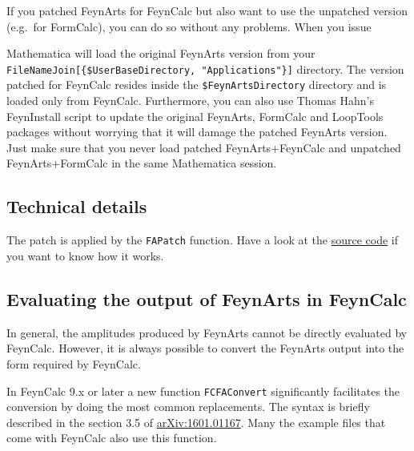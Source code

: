 \documentclass[../FeynCalcManual.tex]{subfiles}
\begin{document}
If you patched FeynArts for FeynCalc but also want to use the unpatched
version (e.g.~for FormCalc), you can do so without any problems. When
you issue

\begin{Shaded}
\begin{Highlighting}[]
\end{Highlighting}
\end{Shaded}

Mathematica will load the original FeynArts version from your
\texttt{FileNameJoin[\allowbreak{}\{\allowbreak{}\$UserBaseDirectory,\ \allowbreak{}"Applications"\}]}
directory. The version patched for FeynCalc resides inside the
\texttt{\$FeynArtsDirectory} directory and is loaded only from FeynCalc.
Furthermore, you can also use Thomas Hahn's FeynInstall script to update
the original FeynArts, FormCalc and LoopTools packages without worrying
that it will damage the patched FeynArts version. Just make sure that
you never load patched FeynArts+FeynCalc and unpatched FeynArts+FormCalc
in the same Mathematica session.

\subsection{Technical details}\label{technical-details}

The patch is applied by the \texttt{FAPatch} function. Have a look at
the
\href{https://github.com/FeynCalc/feyncalc/blob/master/FeynCalc/Feynman/FAPatch.m}{source
code} if you want to know how it works.

\subsection{Evaluating the output of FeynArts in
FeynCalc}\label{evaluating-the-output-of-feynarts-in-feyncalc}

In general, the amplitudes produced by FeynArts cannot be directly
evaluated by FeynCalc. However, it is always possible to convert the
FeynArts output into the form required by FeynCalc.

In FeynCalc 9.x or later a new function \texttt{FCFAConvert}
significantly facilitates the conversion by doing the most common
replacements. The syntax is briefly described in the section 3.5 of
\href{https://arxiv.org/pdf/1601.01167.pdf}{arXiv:1601.01167}. Many the
example files that come with FeynCalc also use this function.
\end{document}
